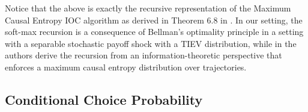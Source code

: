 \documentclass{article}
\begin{document}

Notice that the above is exactly the recursive representation of the Maximum Causal Entropy IOC algorithm as derived in Theorem 6.8 in \cite{ziebart_phd}. In our setting, the soft-max recursion is a consequence of Bellman's optimality principle in a setting with a separable stochastic payoff shock with a TIEV distribution, while in \cite{ziebart_phd} the authors derive the recursion from an information-theoretic perspective that enforces a maximum causal entropy distribution over trajectories.

\subsection{Conditional Choice Probability}

\end{document}
